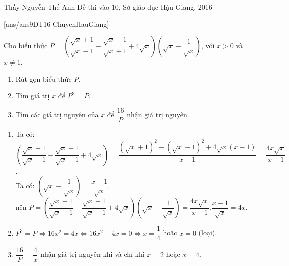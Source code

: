 \begin{name}
{Thầy  Nguyễn Thế Anh}
{Đề thi vào 10, Sở giáo dục Hậu Giang, 2016}
\end{name}
\setcounter{ex}{0}
[ans/ans9DT16-ChuyenHauGiang]
\begin{ex}%
    Cho biểu thức $P=\left( \dfrac{\sqrt{x}+1}{\sqrt{x}-1}-\dfrac{\sqrt{x}-1}{\sqrt{x}+1}+4\sqrt{x} \right)\left( \sqrt{x}-\dfrac{1}{\sqrt{x}} \right)$, với $x>0$ và $x\ne 1$.
    \begin{enumerate}
        \item Rút gọn biểu thức $P$.
        \item Tìm giá trị $x$ để $P^2=P$.
        \item Tìm các giá trị nguyên của $x$ để $\dfrac{16}{P}$ nhận giá trị nguyên.
    \end{enumerate}
\loigiai
    { \begin{enumerate}
    		\item Ta có:
    		$\left( \dfrac{\sqrt{x}+1}{\sqrt{x}-1}-\dfrac{\sqrt{x}-1}{\sqrt{x}+1}+4\sqrt{x} \right)=\dfrac{{{(\sqrt{x}+1)}^{2}}-{{(\sqrt{x}-1)}^{2}}+4\sqrt{x}(x-1)}{x-1}=\dfrac{4x\sqrt{x}}{x-1}$.\\
    		Ta có: $\left( \sqrt{x}-\dfrac{1}{\sqrt{x}} \right)=\dfrac{x-1}{\sqrt{x}}.$\\
    		nên $P=\left( \dfrac{\sqrt{x}+1}{\sqrt{x}-1}-\dfrac{\sqrt{x}-1}{\sqrt{x}+1}+4\sqrt{x} \right)\left( \sqrt{x}-\dfrac{1}{\sqrt{x}} \right)=\dfrac{4x\sqrt{x}}{x-1}.\dfrac{x-1}{\sqrt{x}}=4x$.
    		\item $P^2=P\Leftrightarrow 16x^2=4x\Leftrightarrow 16x^2-4x=0\Leftrightarrow x=\dfrac{1}{4}$ hoặc $x=0$ (loại).
    		\item $\dfrac{16}{P}=\dfrac{4}{x}$ nhận giá trị nguyên khi và chỉ khi $x=2$ hoặc $x=4$.
    	\end{enumerate}
    }
\end{ex}



